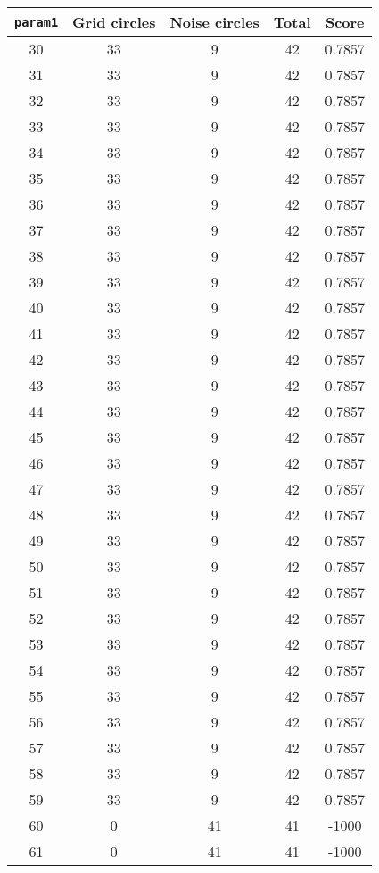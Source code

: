 \documentclass[letterpaper, 12pt]{article}
\begin{document}
\begin{longtable}{|c|c|c|c|c|}
\hline
\textbf{\texttt{param1}} & \textbf{Grid circles} & \textbf{Noise circles} & \textbf{Total} & \textbf{Score} \\
\hline
30 & 33 & 9 & 42 & 0.7857 \\
\hline
31 & 33 & 9 & 42 & 0.7857 \\
\hline
32 & 33 & 9 & 42 & 0.7857 \\
\hline
33 & 33 & 9 & 42 & 0.7857 \\
\hline
34 & 33 & 9 & 42 & 0.7857 \\
\hline
35 & 33 & 9 & 42 & 0.7857 \\
\hline
36 & 33 & 9 & 42 & 0.7857 \\
\hline
37 & 33 & 9 & 42 & 0.7857 \\
\hline
38 & 33 & 9 & 42 & 0.7857 \\
\hline
39 & 33 & 9 & 42 & 0.7857 \\
\hline
40 & 33 & 9 & 42 & 0.7857 \\
\hline
41 & 33 & 9 & 42 & 0.7857 \\
\hline
42 & 33 & 9 & 42 & 0.7857 \\
\hline
43 & 33 & 9 & 42 & 0.7857 \\
\hline
44 & 33 & 9 & 42 & 0.7857 \\
\hline
45 & 33 & 9 & 42 & 0.7857 \\
\hline
46 & 33 & 9 & 42 & 0.7857 \\
\hline
47 & 33 & 9 & 42 & 0.7857 \\
\hline
48 & 33 & 9 & 42 & 0.7857 \\
\hline
49 & 33 & 9 & 42 & 0.7857 \\
\hline
50 & 33 & 9 & 42 & 0.7857 \\
\hline
51 & 33 & 9 & 42 & 0.7857 \\
\hline
52 & 33 & 9 & 42 & 0.7857 \\
\hline
53 & 33 & 9 & 42 & 0.7857 \\
\hline
54 & 33 & 9 & 42 & 0.7857 \\
\hline
55 & 33 & 9 & 42 & 0.7857 \\
\hline
56 & 33 & 9 & 42 & 0.7857 \\
\hline
57 & 33 & 9 & 42 & 0.7857 \\
\hline
58 & 33 & 9 & 42 & 0.7857 \\
\hline
59 & 33 & 9 & 42 & 0.7857 \\
\hline
60 & 0 & 41 & 41 & -1000 \\
\hline
61 & 0 & 41 & 41 & -1000 \\

\end{longtable}
\end{document}
